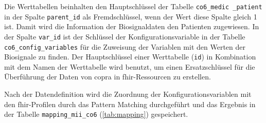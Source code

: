  Die Werttabellen beinhalten den Hauptschlüssel der Tabelle \texttt{co6\_medic \_patient} in der Spalte \texttt{parent\_id} als Fremdschlüssel, wenn der Wert diese Spalte gleich 1 ist. Damit wird die Information der Biosignaldaten den Patienten zugewiesen. In der Spalte \texttt{var\_id} ist der Schlüssel der Konfigurationsvariable in der Tabelle \texttt{co6\_config\_variables} für die Zuweisung der Variablen mit den Werten der Biosignale zu finden. Der Hauptschlüssel einer Werttabelle (\texttt{id}) in Kombination mit dem Namen der Werttabelle wird benutzt, um einen Ersatzschlüssel für die Überführung der Daten von \ac{copra} in \ac{fhir}-Ressourcen zu erstellen.

Nach der Datendefinition wird die Zuordnung der Konfigurationsvariablen mit den \ac{fhir}-Profilen durch das Pattern Matching durchgeführt und das Ergebnis in der Tabelle \texttt{mapping\_mii\_co6} (\ref{tab:mapping}) gespeichert.


